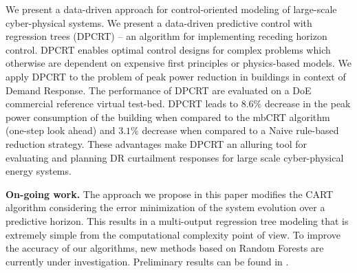 We present a data-driven approach for control-oriented modeling of large-scale cyber-physical systems. 
We present a data-driven predictive control with regression trees (DPCRT) -- an algorithm for implementing receding horizon control. 
DPCRT enables optimal control designs for complex problems which otherwise are dependent on expensive first principles or physics-based models. 
We apply DPCRT to the problem of peak power reduction in buildings in context of Demand Response. 
The performance of DPCRT are evaluated on a DoE commercial reference virtual test-bed. 
DPCRT leads to $8.6\%$ decrease in the peak power consumption of the building when compared to the mbCRT algorithm (one-step look ahead) and $3.1\%$ decrease when compared to a Naive rule-based reduction strategy. 
These advantages make DPCRT an alluring tool for evaluating and planning DR curtailment responses for large scale cyber-physical energy systems.

\textbf{On-going work.} The approach we propose in this paper modifies the CART algorithm considering the error minimization of the system evolution over a predictive horizon. 
This results in a multi-output regression tree modeling that is extremely simple from the computational complexity point of view. 
To improve the accuracy of our algorithms, new methods based on Random Forests are currently under investigation. Preliminary results can be found in \cite{JainACC2017,JainCDC2017}.
